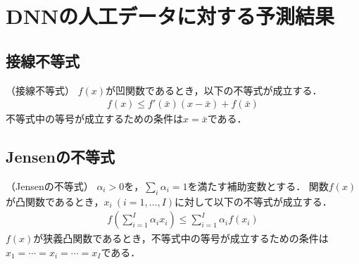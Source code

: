 \chapter{DNNの人工データに対する予測結果}
\label{chap:artificial}

\section{接線不等式}

\begin{lemm} \label{lem:aux:sessen} （接線不等式）
$f(x)$が凹関数であるとき，以下の不等式が成立する．
\begin{align}
f(x) \leq f'(\bar{x}) (x - \bar{x}) + f(\bar{x})
\end{align}
不等式中の等号が成立するための条件は$x = \bar{x}$である．
\end{lemm}

\section{Jensenの不等式}

\begin{lemm} \label{lem:aux:jensen} （Jensenの不等式）
$\alpha_{i} > 0$を，$\sum_{i} \alpha_{i} = 1$を満たす補助変数とする．
関数$f(x)$が凸関数であるとき，$x_{i}\ (i = 1,\ldots,I)$に対して以下の不等式が成立する．
\begin{align}
f \left( \sum_{i=1}^{I} \alpha_{i} x_{i} \right) \leq \sum_{i=1}^{I} \alpha_{i} f(x_{i})
\end{align}
$f(x)$が狭義凸関数であるとき，不等式中の等号が成立するための条件は
$x_1 = \cdots = x_i = \cdots = x_I$である．
\end{lemm}
